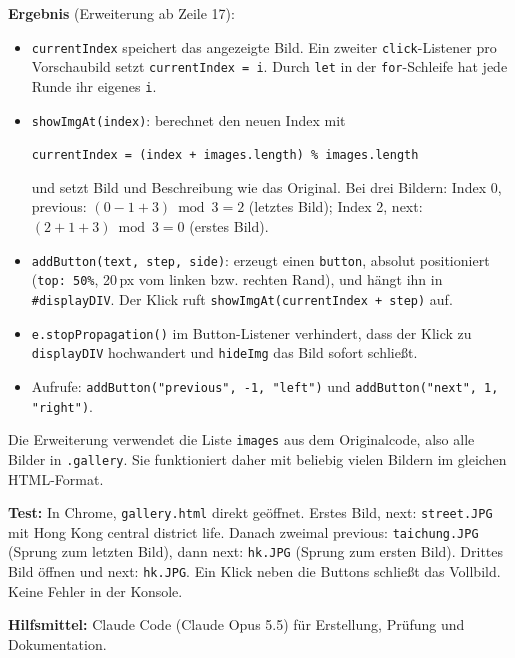 \documentclass[11pt,a4paper]{article}
\begin{document}
\textbf{Ergebnis} (Erweiterung ab Zeile 17):
\begin{itemize}
  \item \texttt{currentIndex} speichert das angezeigte Bild. Ein zweiter
    \texttt{click}-Listener pro Vorschaubild setzt \texttt{currentIndex = i}.
    Durch \texttt{let} in der \texttt{for}-Schleife hat jede Runde ihr
    eigenes \texttt{i}.
  \item \texttt{showImgAt(index)}: berechnet den neuen Index mit
    \begin{center}
    \texttt{currentIndex = (index + images.length) \% images.length}
    \end{center}
    und setzt Bild und Beschreibung wie das Original.
    Bei drei Bildern: Index 0, previous: $(0 - 1 + 3) \bmod 3 = 2$
    (letztes Bild); Index 2, next: $(2 + 1 + 3) \bmod 3 = 0$ (erstes Bild).
  \item \texttt{addButton(text, step, side)}: erzeugt einen
    \texttt{button}, absolut positioniert (\texttt{top: 50\%}, 20\,px vom
    linken bzw. rechten Rand), und hängt ihn in \texttt{\#displayDIV}.
    Der Klick ruft \texttt{showImgAt(currentIndex + step)} auf.
  \item \texttt{e.stopPropagation()} im Button-Listener verhindert, dass der
    Klick zu \texttt{displayDIV} hochwandert und \texttt{hideImg} das Bild
    sofort schließt.
  \item Aufrufe: \texttt{addButton("previous", -1, "left")} und
    \texttt{addButton("next", 1, "right")}.
\end{itemize}
Die Erweiterung verwendet die Liste \texttt{images} aus dem Originalcode,
also alle Bilder in \texttt{.gallery}. Sie funktioniert daher mit
beliebig vielen Bildern im gleichen HTML-Format.

\medskip
\textbf{Test:} In Chrome, \texttt{gallery.html} direkt geöffnet.
Erstes Bild, next: \texttt{street.JPG} mit \glqq Hong Kong central district
life\grqq. Danach zweimal previous: \texttt{taichung.JPG} (Sprung zum
letzten Bild), dann next: \texttt{hk.JPG} (Sprung zum ersten Bild).
Drittes Bild öffnen und next: \texttt{hk.JPG}. Ein Klick neben die
Buttons schließt das Vollbild. Keine Fehler in der Konsole.

\medskip
{\small \textbf{Hilfsmittel:} Claude Code (Claude Opus 5.5) für Erstellung, Prüfung und Dokumentation.}
\end{document}
